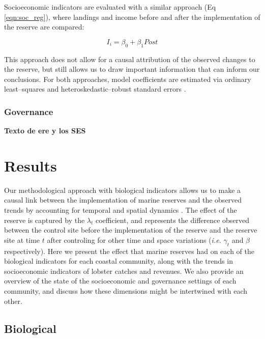 \documentclass{frontiersSCNS}
\theoremstyle{definition}
\theoremstyle{definition}
\theoremstyle{definition}
\theoremstyle{remark}
\begin{document}
Socioeconomic indicators are evaluated with a similar approach (Eq
\ref{eqn:soc_reg}), where landings and income before and after the
implementation of the reserve are compared:

\begin{equation}
I_i = \beta_0 + \beta_1Post
\label{eqn:soc_reg}
\end{equation}

This approach does not allow for a causal attribution of the observed
changes to the reserve, but still allows us to draw important
information that can inform our conclusions. For both approaches, model
coefficients are estimated via ordinary least--squares and
heteroskedastic--robust standard errors \citep{zeileis_2004-7n}.

\subsubsection{Governance}\label{governance}

\textbf{Texto de ere y los SES}

\clearpage

\section{Results}\label{results}

Our methodological approach with biological indicators allows us to make
a causal link between the implementation of marine reserves and the
observed trends by accounting for temporal and spatial dynamics
\citep{depalma_2018}. The effect of the reserve is captured by the
\(\lambda_t\) coefficient, and represents the difference observed
between the control site before the implementation of the reserve and
the reserve site at time \(t\) after controling for other time and space
variations (\emph{i.e.} \(\gamma_t\) and \(\beta\) respectively). Here
we present the effect that marine reserves had on each of the biological
indicators for each coastal community, along with the trends in
socioeconomic indicators of lobster catches and revenues. We also
provide an overview of the state of the socioeconomic and governance
settings of each community, and discuss how these dimensions might be
intertwined with each other.

\subsection{Biological}\label{biological}
\end{document}
